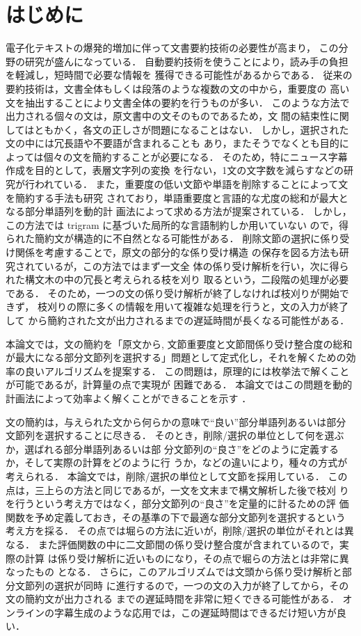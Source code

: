 \section{はじめに}
電子化テキストの爆発的増加に伴って文書要約技術の必要性が高まり，
この分野の研究が盛んになっている\cite{okumura}．
自動要約技術を使うことにより，読み手の負担を軽減し，短時間で必要な情報を
獲得できる可能性があるからである．
従来の要約技術は，文書全体もしくは段落のような複数の文の中から，重要度の
高い文を抽出することにより文書全体の要約を行うものが多い．
このような方法で出力される個々の文は，原文書中の文そのものであるため，文
間の結束性に関してはともかく，各文の正しさが問題になることはない．
しかし，選択された文の中には冗長語や不要語が含まれることも
あり，またそうでなくとも目的によっては個々の文を簡約することが必要になる．
そのため，特にニュース字幕作成を目的として，表層文字列の変換
\cite{tao,kato}を行ない，1文の文字数を減らすなどの研究が行われている．
また，重要度の低い文節や単語を削除することによって文を簡約する手法も研究
されており，単語重要度と言語的な尤度の総和が最大となる部分単語列を動的計
画法によって求める方法\cite{hori}が提案されている．
しかし，この方法では trigram に基づいた局所的な言語制約しか用いていない
ので，得られた簡約文が構造的に不自然となる可能性がある．
削除文節の選択に係り受け関係を考慮することで，原文の部分的な係り受け構造
の保存を図る方法\cite{mikami}も研究されているが，この方法ではまず一文全
体の係り受け解析を行い，次に得られた構文木の中の冗長と考えられる枝を刈り
取るという，二段階の処理が必要である．
そのため，一つの文の係り受け解析が終了しなければ枝刈りが開始できず，
枝刈りの際に多くの情報を用いて複雑な処理を行うと，文の入力が終了して
から簡約された文が出力されるまでの遅延時間が長くなる可能性がある．

本論文では，文の簡約を「原文から, 文節重要度と文節間係り受け整合度の総和
が最大になる部分文節列を選択する」問題として定式化し，それを解くための効
率の良いアルゴリズムを提案する．
この問題は，原理的には枚挙法で解くことが可能であるが，計算量の点で実現が
困難である．
本論文ではこの問題を動的計画法によって効率よく解くことができることを示す
\cite{oguro,oguro2}．

文の簡約は，与えられた文から何らかの意味で``良い''部分単語列あるいは部分
文節列を選択することに尽きる．
そのとき，削除/選択の単位として何を選ぶか，選ばれる部分単語列あるいは部
分文節列の``良さ''をどのように定義するか，そして実際の計算をどのように行
うか，などの違いにより，種々の方式が考えられる．
本論文では，削除/選択の単位として文節を採用している．
この点は，三上らの方法と同じであるが，一文を文末まで構文解析した後で枝刈
りを行うという考え方ではなく，部分文節列の``良さ''を定量的に計るための評
価関数を予め定義しておき，その基準の下で最適な部分文節列を選択するという
考え方を採る．
その点では堀らの方法に近いが，削除/選択の単位がそれとは異なる．
また評価関数の中に二文節間の係り受け整合度が含まれているので，実際の計算
は係り受け解析に近いものになり，その点で堀らの方法とは非常に異なったもの
となる．
さらに，このアルゴリズムでは文頭から係り受け解析と部分文節列の選択が同時
に進行するので，一つの文の入力が終了してから，その文の簡約文が出力される
までの遅延時間を非常に短くできる可能性がある．
オンラインの字幕生成のような応用では，この遅延時間はできるだけ短い方が良
い．

